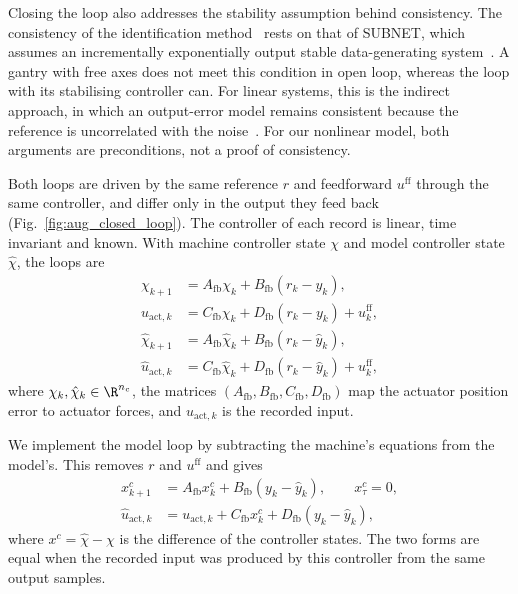 Closing the loop also addresses the stability assumption behind consistency.
The consistency of the identification method~\cite[Sec.~5.5]{hoekstra2026lfr}
rests on that of SUBNET, which assumes an incrementally exponentially output
stable data-generating system~\cite[Cond.~1]{beintema2023subnet}.
A gantry with free axes does not meet this condition in open loop, whereas
the loop with its stabilising controller can.
For linear systems, this is the indirect approach, in which an output-error
model remains consistent because the reference is uncorrelated with the
noise~\cite[Sec.~5.2.1]{forssell1999revisited}.
For our nonlinear model, both arguments are preconditions, not a proof of
consistency.

Both loops are driven by the same reference $r$ and feedforward
$u^{\mathrm{ff}}$ through the same controller, and differ only in the output
they feed back (Fig.~\ref{fig:aug_closed_loop}).
The controller of each record is linear, time invariant and known.
With machine controller state $\chi$ and model controller state $\hat\chi$,
the loops are
\begin{equation}
\begin{aligned}
 \chi_{k+1}&=A_{\mathrm{fb}}\chi_k+B_{\mathrm{fb}}(r_k-y_k),\\
 u_{\mathrm{act},k}&=C_{\mathrm{fb}}\chi_k+D_{\mathrm{fb}}(r_k-y_k)+u^{\mathrm{ff}}_k,\\
 \hat\chi_{k+1}&=A_{\mathrm{fb}}\hat\chi_k+B_{\mathrm{fb}}(r_k-\hat y_k),\\
 \hat u_{\mathrm{act},k}&=C_{\mathrm{fb}}\hat\chi_k+D_{\mathrm{fb}}(r_k-\hat y_k)+u^{\mathrm{ff}}_k,
\end{aligned}
\label{eq:aug_direct_loop}
\end{equation}
where $\chi_k,\hat\chi_k\in\R^{n_c}$, the matrices
$(A_{\mathrm{fb}},B_{\mathrm{fb}},C_{\mathrm{fb}},D_{\mathrm{fb}})$ map the
actuator position error to actuator forces, and $u_{\mathrm{act},k}$ is the
recorded input.

We implement the model loop by subtracting the machine's equations from the
model's.
This removes $r$ and $u^{\mathrm{ff}}$ and gives
\begin{equation}
\begin{aligned}
 x^{c}_{k+1}&=A_{\mathrm{fb}}x^{c}_k+B_{\mathrm{fb}}(y_k-\hat y_k),\qquad x^{c}_\tau=0,\\
 \hat u_{\mathrm{act},k}&=u_{\mathrm{act},k}+C_{\mathrm{fb}}x^{c}_k+D_{\mathrm{fb}}(y_k-\hat y_k),
\end{aligned}
\label{eq:aug_loop}
\end{equation}
where $x^{c}=\hat\chi-\chi$ is the difference of the controller states.
The two forms are equal when the recorded input was produced by this
controller from the same output samples.

